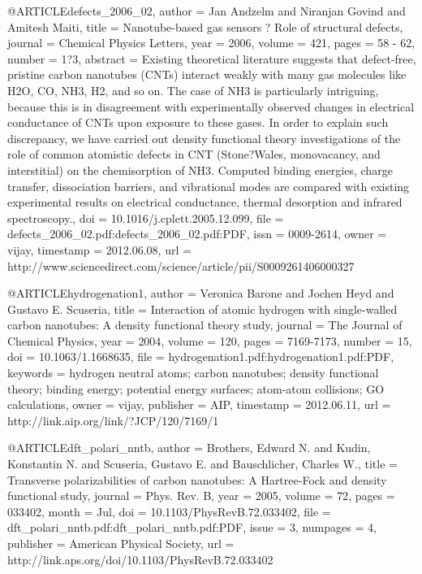 @ARTICLE{defects_2006_02,
  author = {Jan Andzelm and Niranjan Govind and Amitesh Maiti},
  title = {Nanotube-based gas sensors ? Role of structural defects},
  journal = {Chemical Physics Letters},
  year = {2006},
  volume = {421},
  pages = {58 - 62},
  number = {1?3},
  abstract = {Existing theoretical literature suggests that defect-free, pristine
	carbon nanotubes (CNTs) interact weakly with many gas molecules like
	H2O, CO, NH3, H2, and so on. The case of NH3 is particularly intriguing,
	because this is in disagreement with experimentally observed changes
	in electrical conductance of CNTs upon exposure to these gases. In
	order to explain such discrepancy, we have carried out density functional
	theory investigations of the role of common atomistic defects in
	CNT (Stone?Wales, monovacancy, and interstitial) on the chemisorption
	of NH3. Computed binding energies, charge transfer, dissociation
	barriers, and vibrational modes are compared with existing experimental
	results on electrical conductance, thermal desorption and infrared
	spectroscopy.},
  doi = {10.1016/j.cplett.2005.12.099},
  file = {defects_2006_02.pdf:defects_2006_02.pdf:PDF},
  issn = {0009-2614},
  owner = {vijay},
  timestamp = {2012.06.08},
  url = {http://www.sciencedirect.com/science/article/pii/S0009261406000327}
}

@ARTICLE{hydrogenation1,
  author = {Veronica Barone and Jochen Heyd and Gustavo E. Scuseria},
  title = {Interaction of atomic hydrogen with single-walled carbon nanotubes:
	A density functional theory study},
  journal = {The Journal of Chemical Physics},
  year = {2004},
  volume = {120},
  pages = {7169-7173},
  number = {15},
  doi = {10.1063/1.1668635},
  file = {hydrogenation1.pdf:hydrogenation1.pdf:PDF},
  keywords = {hydrogen neutral atoms; carbon nanotubes; density functional theory;
	binding energy; potential energy surfaces; atom-atom collisions;
	GO calculations},
  owner = {vijay},
  publisher = {AIP},
  timestamp = {2012.06.11},
  url = {http://link.aip.org/link/?JCP/120/7169/1}
}

@ARTICLE{dft_polari_nntb,
  author = {Brothers, Edward N. and Kudin, Konstantin N. and Scuseria, Gustavo
	E. and Bauschlicher, Charles W.},
  title = {Transverse polarizabilities of carbon nanotubes: A Hartree-Fock and
	density functional study},
  journal = {Phys. Rev. B},
  year = {2005},
  volume = {72},
  pages = {033402},
  month = {Jul},
  doi = {10.1103/PhysRevB.72.033402},
  file = {dft_polari_nntb.pdf:dft_polari_nntb.pdf:PDF},
  issue = {3},
  numpages = {4},
  publisher = {American Physical Society},
  url = {http://link.aps.org/doi/10.1103/PhysRevB.72.033402}
}

